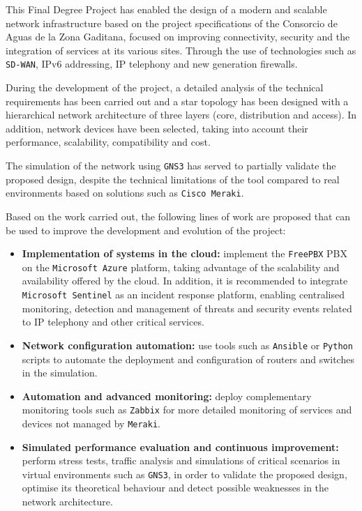 This Final Degree Project has enabled the design of a modern and scalable network infrastructure based on the project specifications of the Consorcio de Aguas de la Zona Gaditana, focused on improving connectivity, security and the integration of services at its various sites. Through the use of technologies such as \texttt{SD-WAN}, IPv6 addressing, IP telephony and new generation firewalls.

\vspace{0.5cm}
During the development of the project, a detailed analysis of the technical requirements has been carried out and a star topology has been designed with a hierarchical network architecture of three layers (core, distribution and access). In addition, network devices have been selected, taking into account their performance, scalability, compatibility and cost.

\vspace{0.5cm}
The simulation of the network using \texttt{GNS3} has served to partially validate the proposed design, despite the technical limitations of the tool compared to real environments based on solutions such as \texttt{Cisco Meraki}.

\vspace{0.5cm}
Based on the work carried out, the following lines of work are proposed that can be used to improve the development and evolution of the project:
\begin{itemize}
  \item \textbf{Implementation of systems in the cloud:} implement the \texttt{FreePBX} PBX on the \texttt{Microsoft Azure} platform, taking advantage of the scalability and availability offered by the cloud. In addition, it is recommended to integrate  \texttt{Microsoft Sentinel} as an incident response platform, enabling centralised monitoring, detection and management of threats and security events related to IP telephony and other critical services.

  \item \textbf{Network configuration automation:} use tools such as \texttt{Ansible} or \texttt{Python} scripts to automate the deployment and configuration of routers and switches in the simulation.

  \item \textbf{Automation and advanced monitoring:} deploy complementary monitoring tools such as \texttt{Zabbix} for more detailed monitoring of services and devices not managed by \texttt{Meraki}.

  \item \textbf{Simulated performance evaluation and continuous improvement:} perform stress tests, traffic analysis and simulations of critical scenarios in virtual environments such as \texttt{GNS3}, in order to validate the proposed design, optimise its theoretical behaviour and detect possible weaknesses in the network architecture.
\end{itemize}